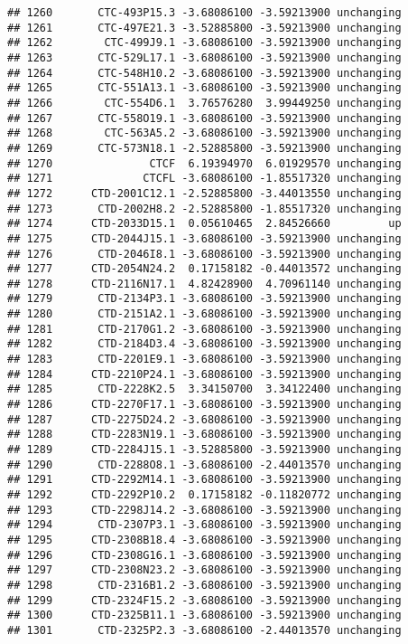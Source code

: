 \documentclass[]{article}
\begin{document}
\begin{verbatim}
## 1260       CTC-493P15.3 -3.68086100 -3.59213900 unchanging
## 1261       CTC-497E21.3 -3.52885800 -3.59213900 unchanging
## 1262        CTC-499J9.1 -3.68086100 -3.59213900 unchanging
## 1263       CTC-529L17.1 -3.68086100 -3.59213900 unchanging
## 1264       CTC-548H10.2 -3.68086100 -3.59213900 unchanging
## 1265       CTC-551A13.1 -3.68086100 -3.59213900 unchanging
## 1266        CTC-554D6.1  3.76576280  3.99449250 unchanging
## 1267       CTC-558O19.1 -3.68086100 -3.59213900 unchanging
## 1268        CTC-563A5.2 -3.68086100 -3.59213900 unchanging
## 1269       CTC-573N18.1 -2.52885800 -3.59213900 unchanging
## 1270               CTCF  6.19394970  6.01929570 unchanging
## 1271              CTCFL -3.68086100 -1.85517320 unchanging
## 1272      CTD-2001C12.1 -2.52885800 -3.44013550 unchanging
## 1273       CTD-2002H8.2 -2.52885800 -1.85517320 unchanging
## 1274      CTD-2033D15.1  0.05610465  2.84526660         up
## 1275      CTD-2044J15.1 -3.68086100 -3.59213900 unchanging
## 1276       CTD-2046I8.1 -3.68086100 -3.59213900 unchanging
## 1277      CTD-2054N24.2  0.17158182 -0.44013572 unchanging
## 1278      CTD-2116N17.1  4.82428900  4.70961140 unchanging
## 1279       CTD-2134P3.1 -3.68086100 -3.59213900 unchanging
## 1280       CTD-2151A2.1 -3.68086100 -3.59213900 unchanging
## 1281       CTD-2170G1.2 -3.68086100 -3.59213900 unchanging
## 1282       CTD-2184D3.4 -3.68086100 -3.59213900 unchanging
## 1283       CTD-2201E9.1 -3.68086100 -3.59213900 unchanging
## 1284      CTD-2210P24.1 -3.68086100 -3.59213900 unchanging
## 1285       CTD-2228K2.5  3.34150700  3.34122400 unchanging
## 1286      CTD-2270F17.1 -3.68086100 -3.59213900 unchanging
## 1287      CTD-2275D24.2 -3.68086100 -3.59213900 unchanging
## 1288      CTD-2283N19.1 -3.68086100 -3.59213900 unchanging
## 1289      CTD-2284J15.1 -3.52885800 -3.59213900 unchanging
## 1290       CTD-2288O8.1 -3.68086100 -2.44013570 unchanging
## 1291      CTD-2292M14.1 -3.68086100 -3.59213900 unchanging
## 1292      CTD-2292P10.2  0.17158182 -0.11820772 unchanging
## 1293      CTD-2298J14.2 -3.68086100 -3.59213900 unchanging
## 1294       CTD-2307P3.1 -3.68086100 -3.59213900 unchanging
## 1295      CTD-2308B18.4 -3.68086100 -3.59213900 unchanging
## 1296      CTD-2308G16.1 -3.68086100 -3.59213900 unchanging
## 1297      CTD-2308N23.2 -3.68086100 -3.59213900 unchanging
## 1298       CTD-2316B1.2 -3.68086100 -3.59213900 unchanging
## 1299      CTD-2324F15.2 -3.68086100 -3.59213900 unchanging
## 1300      CTD-2325B11.1 -3.68086100 -3.59213900 unchanging
## 1301       CTD-2325P2.3 -3.68086100 -2.44013570 unchanging

\end{verbatim}
\end{document}
